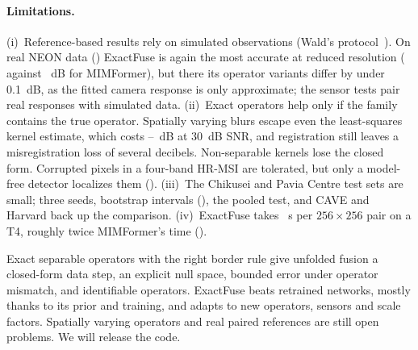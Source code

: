 \documentclass[10pt,twocolumn,letterpaper]{article}
\begin{document}
\paragraph{Limitations.} (i)~Reference-based results rely on simulated observations (Wald's protocol~\cite{vivone2015critical}). On real NEON data (\supp) ExactFuse is again the most accurate at reduced resolution ( against ~dB for MIMFormer), but there its operator variants differ by under 0.1~dB, as the fitted camera response is only approximate; the sensor tests pair real responses with simulated data. (ii)~Exact operators help only if the family contains the true operator. Spatially varying blurs escape even the least-squares kernel estimate, which costs --~dB at 30~dB SNR, and registration still leaves a misregistration loss of several decibels. Non-separable kernels lose the closed form. Corrupted pixels in a four-band HR-MSI are tolerated, but only a model-free detector localizes them (\supp). (iii)~The Chikusei and Pavia Centre test sets are small; three seeds, bootstrap intervals (\supp), the pooled test, and CAVE and Harvard back up the comparison. (iv)~ExactFuse takes ~s per $256\times256$ pair on a T4, roughly twice MIMFormer's time (\supp).

Exact separable operators with the right border rule give unfolded fusion a closed-form data step, an explicit null space, bounded error under operator mismatch, and identifiable operators. ExactFuse beats  retrained networks, mostly thanks to its prior and training, and adapts to new operators, sensors and scale factors. Spatially varying operators and real paired references are still open problems. We will release the code.

{
    \small
    
    
}
\end{document}
